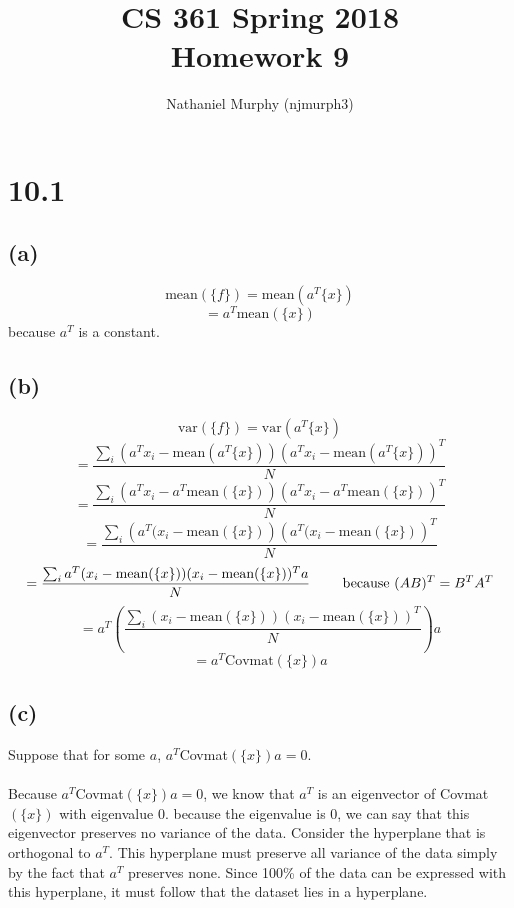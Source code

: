 \documentclass[11pt]{article}
\title{\textbf{CS 361 Spring 2018\\Homework 9}}
\author{Nathaniel Murphy (njmurph3)}
\date{}
\newcommand{\mean}{\text{mean}}
\newcommand{\var}{\text{var}}
\begin{document}
\maketitle
\section*{10.1}
\subsection*{(a)}
\[\text{mean}(\{f\})=\text{mean}(a^T\{x\})\]
\[=a^T\text{mean}(\{x\})\]
because $a^T$ is a constant.
\subsection*{(b)}
\[\var(\{f\})=\var(a^T\{x\})\]
\[=\frac{\sum_i\left(a^Tx_i-\mean(a^T\{x\})\right)\left(a^Tx_i-\mean(a^T\{x\})\right)^T}{N}\]
\[=\frac{\sum_i\left(a^Tx_i-a^T\mean(\{x\})\right)\left(a^Tx_i-a^T\mean(\{x\})\right)^T}{N}\]
\[=\frac{\sum_i\left(a^T(x_i-\mean(\{x\})\right)\left(a^T(x_i-\mean(\{x\})\right)^T}{N}\]
\[=\frac{\sum_ia^T(x_i-\mean(\{x\}))(x_i-\mean(\{x\}))^Ta}{N}\hspace{7mm}\text{ because }(AB)^T=B^TA^T\]
\[=a^T\left(\frac{\sum_i(x_i-\mean(\{x\}))(x_i-\mean(\{x\}))^T}{N}\right)a\]
\[=a^T\text{Covmat}(\{x\})a\]
\subsection*{(c)}
Suppose that for some $a$, $a^T$Covmat$(\{x\})a=0$. \\ \\
Because $a^T$Covmat$(\{x\})a=0$, we know that $a^T$ is an eigenvector of Covmat$(\{x\})$ with eigenvalue 0. because the eigenvalue is 0, we can say that this eigenvector preserves no variance of the data. Consider the hyperplane that is orthogonal to $a^T$. This hyperplane must preserve all variance of the data simply by the fact that $a^T$ preserves none. Since 100\% of the data can be expressed with this hyperplane, it must follow that the dataset lies in a hyperplane.
\clearpage
\end{document}
